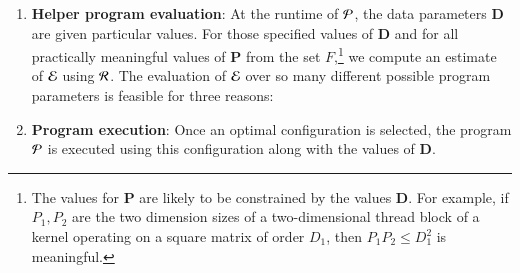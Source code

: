 \begin{enumerate}
\begin{enumerateshort}
\end{enumerateshort}
\item \textbf{Helper program evaluation}: 
At the runtime of ${\cal P}$, the data parameters $\bm{D}$ are given
particular values.
For those specified values of $\bm{D}$ and for
all practically meaningful values of $\bm{P}$ from
the set $F$,\footnote{The values for
$\bm{P}$ are likely to be constrained by
the values $\bm{D}$.  For example,
if $P_1, P_2$ are the two dimension sizes of a two-dimensional
thread block of a {\cuda} kernel operating on a
square matrix of order $D_1$, then $P_1 P_2 \leq D_1^2$
is meaningful.} we compute an estimate of ${\cal E}$ using ${\cal R}$.
The evaluation of ${\cal E}$ over so many different possible
program parameters is feasible for three reasons:
\item \textbf{Program execution}: 
%
Once an optimal configuration is selected, the
program ${\cal P}$ is  executed using this
configuration along with the values
of $\bm{D}$.

\end{enumerate}

